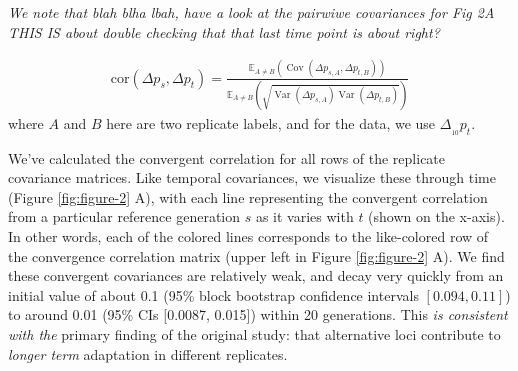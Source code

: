 \documentclass[11pt]{article}
\newcommand{\gc}[1]{{\it \color{red} #1 } }
\newcommand{\vb}[1]{{\it \color{blue} #1}}
\newcommand{\E}{\mathbb{E}}
\DeclareMathOperator{\var}{Var}
\DeclareMathOperator{\cov}{Cov}
\begin{document}
\vb{We note that blah blha lbah, have a look at the pairwiwe covariances for
Fig 2A} \gc{THIS IS about double checking that that last time point is
about right?}

\begin{align}
  \label{eq:conv-corr}
  \mathrm{cor}(\Delta p_s, \Delta p_t) = \frac{\E_{A\ne B} \left( \cov(\Delta p_{s,A}, \Delta p_{t,B}) \right)}{\E_{A\ne B} \left( \sqrt{\var(\Delta p_{s,A}) \var(\Delta p_{t,B})} \right)}
\end{align}
%
where $A$ and $B$ here are two replicate labels, and for the
\textcite{Barghi2019-qy} data, we use $\Delta_{_{10}} p_t$.

We've calculated the convergent correlation for all rows of the replicate
covariance matrices. Like temporal covariances, we visualize these through time
(Figure \ref{fig:figure-2} A), with each line representing the convergent
correlation from a particular reference generation $s$ as it varies with $t$
(shown on the x-axis). In other words, each of the colored lines corresponds to
the like-colored row of the convergence correlation matrix (upper left in
Figure \ref{fig:figure-2} A). We find these convergent covariances are
relatively weak, and decay very quickly from an initial value of about 0.1
(95\% block bootstrap confidence intervals $[0.094, 0.11]$) to around 0.01
(95\% CIs [0.0087, 0.015]) within 20 generations. This \gc{is
  consistent with the}
primary finding of the original \textcite{Barghi2019-qy} study: that
alternative loci contribute to \gc{longer term} adaptation in different replicates.
\end{document}
